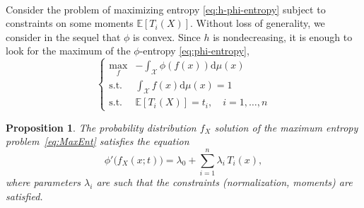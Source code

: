 \documentclass[english,onecolumn]{elsarticle}
\def\dmu{\mathrm{d}\mu}
\def\X{\mathcal{X}}
\newcommand\Esp[1]{\mathbb{E}\left[ #1 \right]}
\newtheorem{proposition}{Proposition}
\begin{document}
\

Consider the  problem of maximizing entropy  \eqref{eq:h-phi-entropy} subject to
constraints  on some  moments  $\Esp{T_i(X)}$. Without  loss  of generality,  we
consider in the sequel that $\phi$  is convex. Since $h$ is nondecreasing, it is
enough to look for the maximum of the $\phi$-entropy \eqref{eq:phi-entropy},
%
\begin{equation}
\begin{cases}
\max_f & \displaystyle - \int_\X \phi(f(x)) \dmu(x)\\[5mm]
%
\text{s.t. } & \displaystyle \int_\X f(x) \dmu(x) = 1\\[5mm]
%
\text{s.t. } & \Esp{T_i(X)} = t_i, \quad i = 1, \ldots, n
%
\end{cases}
\label{eq:MaxEnt}
\end{equation}
%
\begin{proposition}
  The   probability  distribution   $f_X$  solution   of  the   maximum  entropy
  problem~\eqref{eq:MaxEnt} satisfies the equation
%
\begin{equation}
\phi' \big( f_X(x;t) \big) = \lambda_0 + \sum_{i=1}^n \lambda_i \, T_i(x),
\label{eq:sol-h-phi}
\end{equation}
%
where  parameters  $\lambda_i$ are  such  that  the constraints  (normalization,
moments) are satisfied.
\end{proposition}
%
\end{document}
